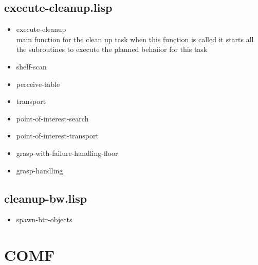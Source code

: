 \documentclass[main.tex]{subfiles}
\begin{document}
	  	\subsection{execute-cleanup.lisp}
	  	\begin{itemize}
			\item execute-cleanup \\
			main function for the clean up task when this function is called it starts all the subroutines to execute the planned behaiior for this task
			\item shelf-scan \\
			
			\item perceive-table \\
			
			\item transport \\
			
			\item point-of-interest-search \\
			
			\item point-of-interest-transport \\
			
			\item grasp-with-failure-handling-floor \\
			
			\item grasp-handling\\
		\end{itemize}

	    \subsection{cleanup-bw.lisp}
		\begin{itemize}
			\item spawn-btr-objects
		\end{itemize}
	  	
	  	\section{COMF}
\end{document}
